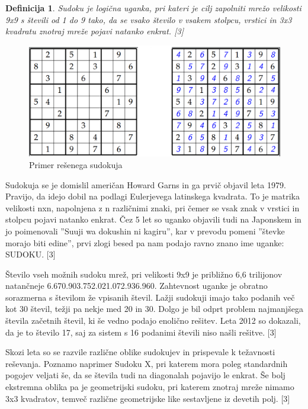 \documentclass[A4paper, 11pt]{article}
\newtheorem{definicija}{Definicija}
\begin{document}
\begin{definicija} %
Sudoku je logična uganka, pri kateri je cilj zapolniti mrežo velikosti 9x9 s števili od 1 do 9 tako, da se vsako število v vsakem stolpcu, vrstici in 3x3 kvadratu znotraj mreže pojavi natanko enkrat. [3]
\end{definicija}

\begin{figure}[h] %
\centering
\caption{Primer rešenega sudokuja}
\includegraphics[scale=0.4]{sudoku_resen}
\end{figure}

Sudokuja se je domislil američan Howard Garns in ga prvič objavil leta 1979. Pravijo, da idejo dobil na podlagi Eulerjevega latinskega kvadrata. To je matrika velikosti nxn, napolnjena z n različnimi znaki, pri čemer se vsak znak v vrstici in stolpcu pojavi natanko enkrat. Čez 5 let so uganko objavili tudi na Japonskem in jo poimenovali ''Suuji wa dokushin ni kagiru'', kar v prevodu pomeni ''števke morajo biti edine'', prvi zlogi besed pa nam podajo ravno znano ime uganke: SUDOKU. [3]


Število vseh možnih sudoku mrež, pri velikosti 9x9 je približno 6,6 trilijonov natančneje 6.670.903.752.021.072.936.960. 
Zahtevnost uganke je obratno sorazmerna s številom že vpisanih števil. Lažji sudokuji imajo tako podanih več kot 30 števil, težji pa nekje med 20 in 30. Dolgo je bil odprt problem najmanjšega števila začetnih števil, ki še vedno podajo enolično rešitev. Leta 2012 so dokazali, da je to število 17, saj za sistem s 16 podanimi števili niso našli rešitve. [3]

Skozi leta so se razvile različne oblike sudokujev in prispevale k težavnosti reševanja. Poznamo naprimer Sudoku X, pri katerem mora poleg standardnih pogojev veljati še, da se števila tudi na diagonalah pojavijo le enkrat. Še bolj ekstremna oblika pa je geometrijski sudoku, pri katerem znotraj mreže nimamo 3x3 kvadratov, temveč različne geometrijske like sestavljene iz devetih polj. [3]
\end{document}
